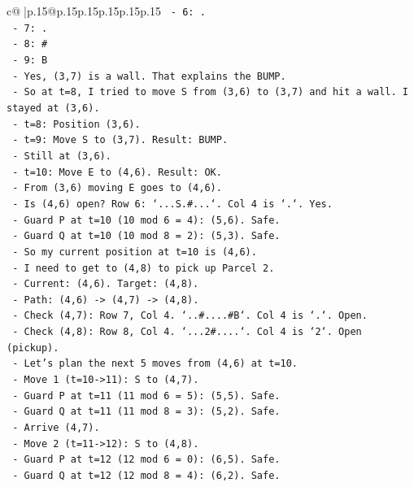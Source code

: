 \documentclass{article}
\begin{document}
{\begin{supertabular}{c@{$\;$}|p{.15\linewidth}@{}p{.15\linewidth}p{.15\linewidth}p{.15\linewidth}p{.15\linewidth}p{.15\linewidth}}
{{{\texttt{    {-} 6: .} \\
\texttt{    {-} 7: .} \\
\texttt{    {-} 8: \#} \\
\texttt{    {-} 9: B} \\
\texttt{    {-} Yes, (3,7) is a wall. That explains the BUMP.} \\
\texttt{  {-} So at t=8, I tried to move S from (3,6) to (3,7) and hit a wall. I stayed at (3,6).} \\
\texttt{  {-} t=8: Position (3,6).} \\
\texttt{  {-} t=9: Move S to (3,7). Result: BUMP.} \\
\texttt{    {-} Still at (3,6).} \\
\texttt{  {-} t=10: Move E to (4,6). Result: OK.} \\
\texttt{    {-} From (3,6) moving E goes to (4,6).} \\
\texttt{    {-} Is (4,6) open? Row 6: `...S.\#...`. Col 4 is `.`. Yes.} \\
\texttt{    {-} Guard P at t=10 (10 mod 6 = 4): (5,6). Safe.} \\
\texttt{    {-} Guard Q at t=10 (10 mod 8 = 2): (5,3). Safe.} \\
\texttt{  {-} So my current position at t=10 is (4,6).} \\
\texttt{  {-} I need to get to (4,8) to pick up Parcel 2.} \\
\texttt{  {-} Current: (4,6). Target: (4,8).} \\
\texttt{  {-} Path: (4,6) {-}> (4,7) {-}> (4,8).} \\
\texttt{  {-} Check (4,7): Row 7, Col 4. `..\#....\#B`. Col 4 is `.`. Open.} \\
\texttt{  {-} Check (4,8): Row 8, Col 4. `...2\#....`. Col 4 is `2`. Open (pickup).} \\
\texttt{  {-} Let's plan the next 5 moves from (4,6) at t=10.} \\
\texttt{  {-} Move 1 (t=10{-}>11): S to (4,7).} \\
\texttt{    {-} Guard P at t=11 (11 mod 6 = 5): (5,5). Safe.} \\
\texttt{    {-} Guard Q at t=11 (11 mod 8 = 3): (5,2). Safe.} \\
\texttt{    {-} Arrive (4,7).} \\
\texttt{  {-} Move 2 (t=11{-}>12): S to (4,8).} \\
\texttt{    {-} Guard P at t=12 (12 mod 6 = 0): (6,5). Safe.} \\
\texttt{    {-} Guard Q at t=12 (12 mod 8 = 4): (6,2). Safe.} \\
}}}
\end{supertabular}}
\end{document}
